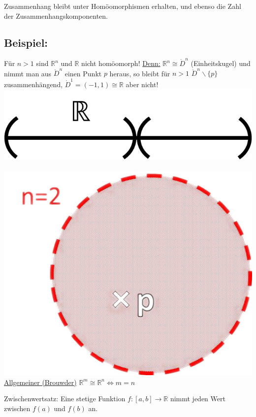 \documentclass[a4paper,11pt,notitlepage]{report}
\theoremstyle{definition}
\newcommand{\R}{{\ensuremath{\mathbb{R}}}}
\newenvironment{bsp}[1]
{
\setlength{\fboxsep}{10pt}
\subsection*{Beispiel: #1}
\begin{upshape}
}
{
\end{upshape}
}
\begin{document}
\begin{corollary}
	Zusammenhang bleibt unter Homöomorphismen erhalten, und ebenso die Zahl der Zusammenhangskomponenten.
\end{corollary}

\begin{bsp}{}
	Für $n > 1$ sind $\R^n$ und $\R$ nicht homöomorph!
	\newline
	\underline{Denn:} $\R^n \cong \mathring{D}^n$ (Einheitskugel) und nimmt man aus $\mathring{D}^n$ einen Punkt $p$ heraus, so bleibt für $n>1$ $\mathring{D}^n \backslash \{p\}$ zusammenhängend, $\mathring{D}^1 = (-1,1) \cong \R$ aber nicht!
	\newline
\includegraphics[scale=0.4]{images/R_ohne_p.png}$\qquad\qquad$
\includegraphics[scale=0.4]{images/R2_ohne_p.png}
	\newline
	\underline{Allgemeiner (Brouwder)} $\R^m \cong \R^n \Leftrightarrow m=n$
\end{bsp}

\begin{corollary}{Zwischenwertsatz:}
	Eine stetige Funktion $f \colon [a,b] \rightarrow \R$ nimmt jeden Wert zwischen $f(a)$ und $f(b)$ an.
\end{corollary}
\end{document}
